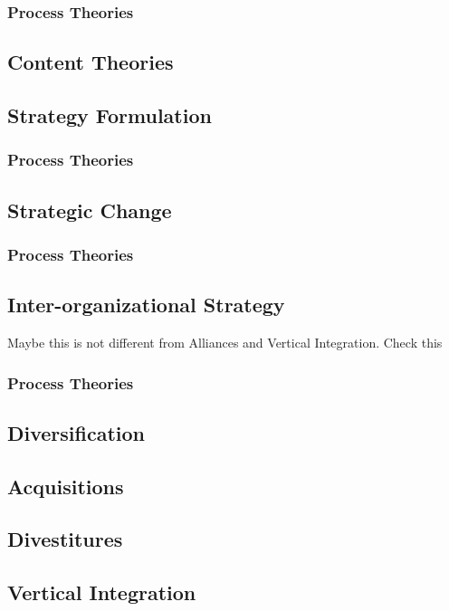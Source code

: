 \documentclass[12pt,letterpaper]{article}
\begin{document}
\subsubsection{Process Theories}
\subsection{Content Theories}

\subsection{Strategy Formulation}
\subsubsection{Process Theories}

\subsection{Strategic Change}
\subsubsection{Process Theories}

\subsection{Inter-organizational Strategy}
Maybe this is not different from Alliances and Vertical Integration. Check this
\subsubsection{Process Theories}

\subsection{Diversification}

\subsection{Acquisitions}

\subsection{Divestitures}

\subsection{Vertical Integration}
\end{document}
